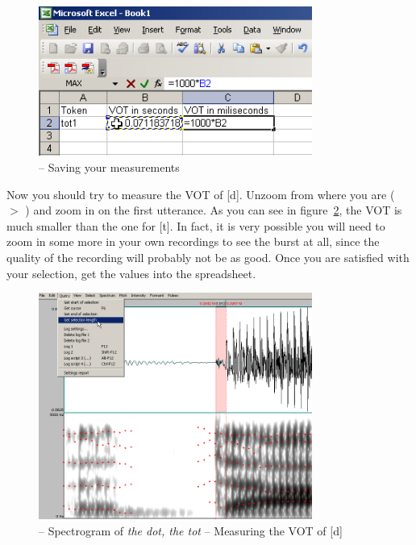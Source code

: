 \begin{figure}[!tbp]
\caption{\MSExcel{} -- Saving your measurements}
\label{step4VOT}
	\begin{center}
		\includegraphics[width=0.8\textwidth]{./figures/Part-C-VOT-thedotthetot-Excel01}
	\end{center}
\end{figure}

Now you should try to measure the VOT of [d]. Unzoom from where you are ( $>$ ) and zoom in on the first utterance. As you can see in figure~\ref{step5VOT}, the VOT is much smaller than the one for [t]. In fact, it is very possible you will need to zoom in some more in your own recordings to see the burst at all, since the quality of the recording will probably not be as good. Once you are satisfied with your selection, get the values into the spreadsheet.

\begin{figure}[!tbp]
\caption{\Praat{} -- Spectrogram of \emph{the dot, the tot} -- Measuring the VOT of [d]}
\label{step5VOT}
	\begin{center}
		\includegraphics[width=0.8\textwidth]{./figures/Part-C-VOT-thedotthetot-measuring-voiced}
	\end{center}
\end{figure}
 
